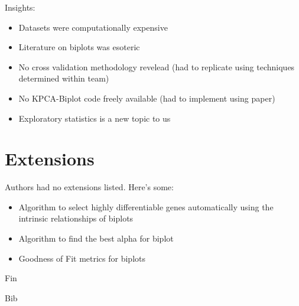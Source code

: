 \documentclass[serif]{beamer}
\begin{document}
	\begin{frame}
		Insights:
		\begin{itemize}
			\item  Datasets were computationally expensive
			\item  Literature on biplots was esoteric
			\item  No cross validation methodology revelead (had to
			replicate using techniques determined within team)
			\item  No KPCA-Biplot code freely available (had to implement
			using paper)
			\item  Exploratory statistics is a new topic to us
		\end{itemize}
	\end{frame}
	
	\section{Extensions}
	
	\begin{frame}
		Authors had no extensions listed. Here's some:
		\begin{itemize}
			\item  Algorithm to select highly differentiable genes automatically
			using the intrinsic relationships of biplots
			\item  Algorithm to find the best alpha for biplot
			\item  Goodness of Fit metrics for biplots
		\end{itemize}
	\end{frame}
	
	\begin{frame}
		Fin
	\end{frame}

	\begin{frame}
		Bib
	\end{frame}
	
\end{document}
